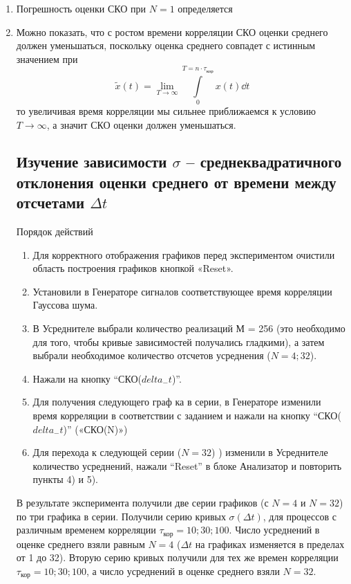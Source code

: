 \begin{enumerate}
    \item Погрешность оценки СКО при $N=1$ определяется
    \item Можно показать, что с ростом времени корреляции СКО оценки среднего должен уменьшаться, поскольку оценка среднего совпадет с истинным значением при
        \begin{equation}
            \label{eq:}
            \tilde x(t) = \lim_{T \to \infty} \int\limits_{0}^{T = n\cdot \tau_{\text{кор}}}  x(t) \dd{t}
        \end{equation}
то увеличивая время корреляции мы сильнее приближаемся к условию $T \to \infty$, а значит СКО оценки должен уменьшаться.
\subsection[Задание 4]{Изучение зависимости $\sigma$ -- среднеквадратичного отклонения оценки среднего от времени между отсчетами $\Delta t$}
Порядок действий
\begin{enumerate}
	\item Для корректного отображения графиков перед экспериментом очистили область построения графиков кнопкой «Reset».
	\item Установили в Генераторе сигналов соответствующее время корреляции Гауссова шума.
	\item В Усреднителе выбрали количество реализаций М = 256 (это необходимо для того, чтобы кривые зависимостей получались гладкими), а затем выбрали необходимое количество отсчетов усреднения ($N = 4; 32$).
	\item Нажали на кнопку “СКО($delta_{-}t$)”.
	\item Для получения следующего граф ка в серии, в Генераторе изменили время корреляции в соответствии с заданием и нажали на кнопку “СКО($delta_{-}t$)” («СКО(N)»)
	\item Для перехода к следующей серии ($N=32$) ) изменили в Усреднителе количество усреднений, нажали “Reset” в блоке Анализатор и повторить пункты 4) и 5).
\end{enumerate}
В результате эксперимента получили две серии графиков (с $N = 4$ и $N = 32$) по три графика в серии.
Получили серию кривых $\sigma(\Delta t)$, для процессов с различным временем корреляции $\tau_\text{кор}= 10; 30; 100$. Число усреднений в оценке среднего взяли равным $N = 4$ ($\Delta t$ на графиках изменяется в пределах от 1 до 32).
Вторую серию кривых получили для тех же времен корреляции $\tau_\text{кор}= 10; 30; 100$, а число усреднений в оценке среднего взяли $N = 32$.

\end{enumerate}
